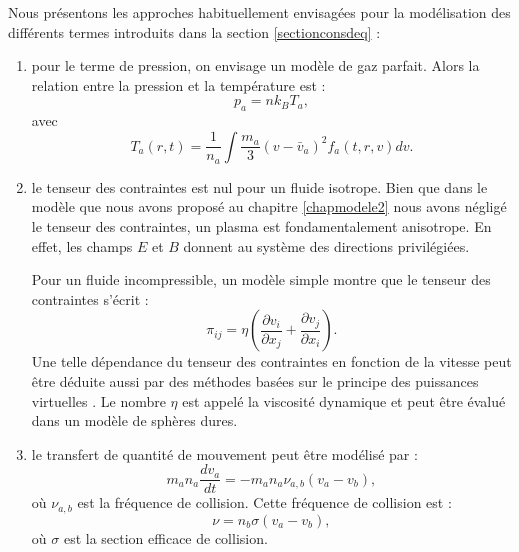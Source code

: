 \documentclass{book}
\begin{document}
Nous pr\'esentons les approches habituellement envisag\'ees pour la
mod\'elisation des diff\'erents termes introduits dans la section
\ref{sectionconsdeq} :  

\begin{enumerate}
\item pour le terme de pression, on envisage un mod\`ele de gaz
parfait.
Alors la relation entre la pression et la
temp\'erature est : 
\begin{equation}
p_a=n k_B T_a,
\end{equation}
avec 
\begin{equation}
T_a(r,t)=\frac{1}{n_a}\int \frac{m_a}{3}(v-\bar v_a)^2f_a(t,r,v)d v.
\end{equation}

\item le tenseur 
des contraintes est nul pour un fluide isotrope. Bien
que dans le mod\`ele que nous avons propos\'e au chapitre
\ref{chapmodele2} nous avons n\'eglig\'e le tenseur des contraintes,
un plasma est fondamentalement anisotrope. En effet, les champs $E$ et
$B$ donnent au syst\`eme des directions privil\'egi\'ees.

Pour un fluide incompressible, un mod\`ele simple
\cite{Reif64,LandauFlu,LandauCine} montre que le tenseur des contraintes
s'\'ecrit : 
\begin{equation}
\pi_{i j}=\eta(\frac{\partial v_i}{\partial x_j}+\frac{\partial
v_j}{\partial x_i}). 
\end{equation}
Une telle d\'ependance du tenseur des contraintes en fonction de la
vitesse peut \^etre d\'eduite aussi par des m\'ethodes bas\'ees sur le
principe des puissances virtuelles  \cite{Germain80,Dautray1}.
Le nombre $\eta$ est appel\'e la viscosit\'e dynamique et peut \^etre
\'evalu\'e dans un mod\`ele de sph\`eres dures.

\item le transfert de quantit\'e de mouvement peut \^etre mod\'elis\'e
par \cite{Delcroix94,Chen84} :
\begin{equation}
m_an_a\frac{d v_a}{dt}=-m_an_a\nu_{a,b} (v_a - v_b),
\end{equation}
o\`u $\nu_{a,b}$ est la fr\'equence de collision.
Cette fr\'equence de collision est :
\begin{equation}
\nu=n_b\sigma (v_a - v_b),
\end{equation}
o\`u $\sigma$ est la section efficace de collision.
\end{enumerate}
\end{document}
